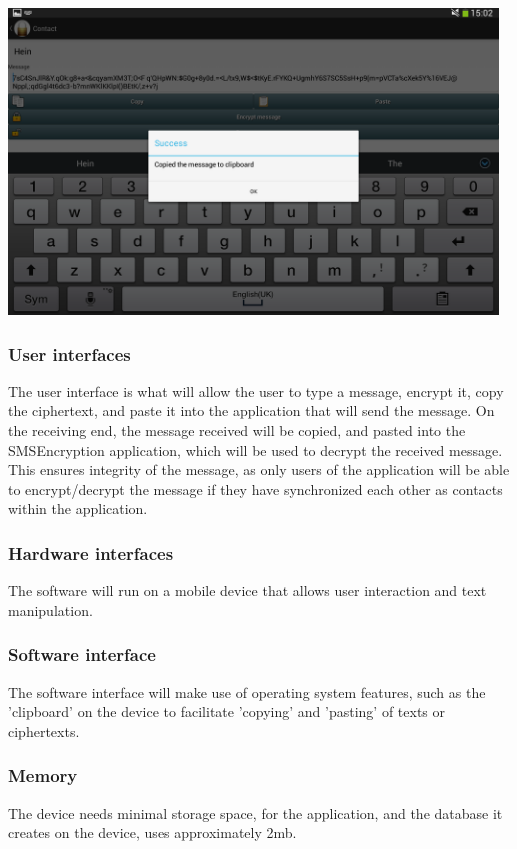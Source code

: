 \begin{center}
 \includegraphics[width=13cm]{screenshots/tablet/8_MessageCopied.png}
\end{center}
\subsubsection{User interfaces}
 The user interface is what will allow the user to type a message, encrypt it, copy the ciphertext, and paste it into the application that will send the message. On the receiving end, the message received will be copied, and pasted into the SMSEncryption application, which will be used to decrypt the received message. This ensures integrity of the message, as only users of the application will be able to encrypt/decrypt the message if they have synchronized each other as contacts within the application.
\subsubsection{Hardware interfaces}
The software will run on a mobile device that allows user interaction and text manipulation.
\subsubsection{Software interface}
The software interface will make use of operating system features, such as the 'clipboard' on the device to facilitate 'copying' and 'pasting' of texts or ciphertexts.
\subsubsection{Memory}
The device needs minimal storage space, for the application, and the database it creates on the device, uses approximately 2mb.
